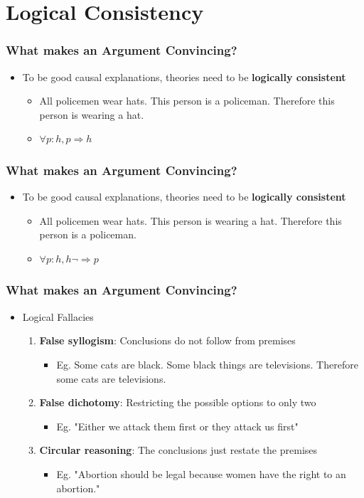 \documentclass[xcolor=x11names,compress]{beamer}\usepackage[]{graphicx}\usepackage[]{color}
\renewcommand{\(}{\begin{columns}}
\renewcommand{\)}{\end{columns}}
\newcommand{\<}[1]{\begin{column}{#1}}
\renewcommand{\>}{\end{column}}
\begin{document}
\section{Logical Consistency}

\begin{frame}
\frametitle{What makes an Argument Convincing?}
\begin{itemize}
\item To be good causal explanations, theories need to be \textbf{logically consistent}
\begin{itemize}
\item All policemen wear hats. This person is a policeman. Therefore this person is wearing a hat.
\item $\forall p:  h, p \Rightarrow h$
\end{itemize}
\end{itemize}
\end{frame}

\begin{frame}
\frametitle{What makes an Argument Convincing?}
\begin{itemize}
\item To be good causal explanations, theories need to be \textbf{logically consistent}
\begin{itemize}
\item All policemen wear hats. This person is wearing a hat. Therefore this person is a policeman.
\item $\forall p:  h, h \lnot \Rightarrow p$  
\end{itemize}
\end{itemize}
\end{frame}

\begin{frame}
\frametitle{What makes an Argument Convincing?}
\begin{itemize}
\item Logical Fallacies
\begin{enumerate}
\item \textbf{False syllogism}: Conclusions do not follow from premises
\begin{itemize}
\item Eg. Some cats are black. Some black things are televisions. Therefore some cats are televisions.
\end{itemize}
\item \textbf{False dichotomy}: Restricting the possible options to only two
\begin{itemize}
\item Eg. "Either we attack them first or they attack us first"
\end{itemize}
\item \textbf{Circular reasoning}: The conclusions just restate the premises
\begin{itemize}
\item Eg. "Abortion should be legal because women have the right to an abortion."
\end{itemize}
\end{enumerate}
\end{itemize}
\end{frame}
\end{document}
